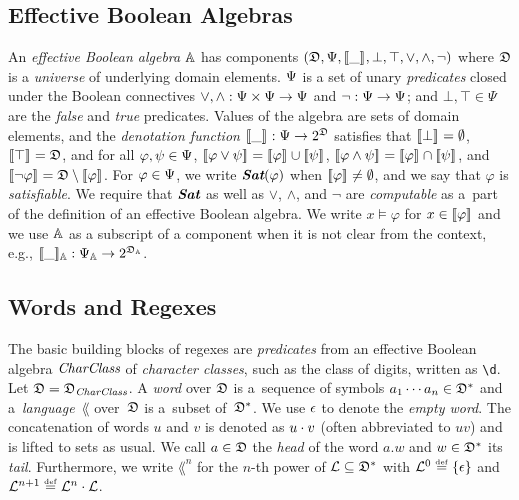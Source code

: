 \documentclass[acmsmall,screen]{acmart}
\begin{document}
\subsection{Effective Boolean Algebras}

An \emph{effective Boolean algebra} $\AA$ has components
$(\DOM,\PRED,\den{\_},\bot,\top,\vee,\wedge,\neg)$ where $\DOM$ is a
\emph{universe} of underlying domain
elements.  $\PRED$ is a set of unary \emph{predicates} closed under
the Boolean connectives $\vee,\wedge:\PRED\times\PRED\rightarrow\PRED$
and $\neg:\PRED\rightarrow\PRED$; and $\bot,\top\in\Psi$ are
the \emph{false} and \emph{true} predicates. 
Values of the algebra are sets of
domain elements, and the \emph{denotation function}
$\den{\_}:\PRED\rightarrow 2^{\DOM}$ satisfies that $\den{\bot} = \emptyset$,
$\den{\top} = \DOM$, and for all $\varphi,\psi\in\PRED$,
$\den{\varphi\vee\psi} = \den{\varphi}\cup\den{\psi}$,
$\den{\varphi\wedge\psi} = \den{\varphi}\cap\den{\psi}$, and
$\den{\neg\varphi} = \DOM\setminus\den{\varphi}$. For
$\varphi\in\PRED$, we write $\SAT(\varphi)$ when
$\den{\varphi}\neq\emptyset$, and we say that $\varphi$ is
\emph{satisfiable}. 
We require that $\SAT$ 
as well as  
$\vee$, $\wedge$, and $\neg$ are \emph{computable} as a~part
of the definition of an effective Boolean algebra.
We write $x\models\varphi$ for $x\in\den{\varphi}$ and 
 we use $\AA$ as a subscript of a component when it is
 not clear from the context, e.g.,
 $\den[\AA]{\_}:\PRED_{\AA}\rightarrow 2^{\DOM_{\AA}}$.%


\subsection{Words and Regexes}

The basic building blocks of regexes are
\emph{predicates} from an effective Boolean algebra $\CharClass$ of
\emph{character classes}, such as the class of digits, written as \verb+\d+.
Let $\DOM = \DOM_{\CharClass}$.
A \emph{word} over $\DOM$ is a~sequence of symbols $a_1 \cdots a_n \in
\DOM^*$ and a~\emph{language}~$\lang$ over~$\DOM$ is a~subset of~$\DOM^*$.
We use $\eps$ to denote the \emph{empty word}.
The concatenation of words $u$ and $v$ is denoted as $u \concat v$ (often
abbreviated to $uv$) and is lifted to sets as usual.
We call $a\in\DOM$ the \emph{head} of the word $a.w$ and $w\in \DOM^*$ its \emph{tail}.
Furthermore, we write $\lang^n$ for the $n$-th power of $\lang\subseteq\DOM^*$ with
$\lang^0
\eqdef \{\eps\}$ and $\lang^{n+1} \eqdef \lang^n\concat \lang$.
\end{document}
